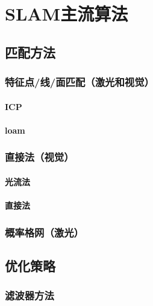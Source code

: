 \section{SLAM主流算法}
\subsection{匹配方法}
\subsubsection{特征点/线/面匹配（激光和视觉）}
\paragraph{ICP}
\paragraph{loam}
\subsubsection{直接法（视觉）}
\paragraph{光流法}
\paragraph{直接法}
\subsubsection{概率格网（激光）}
\subsection{优化策略}
\subsubsection{滤波器方法}
